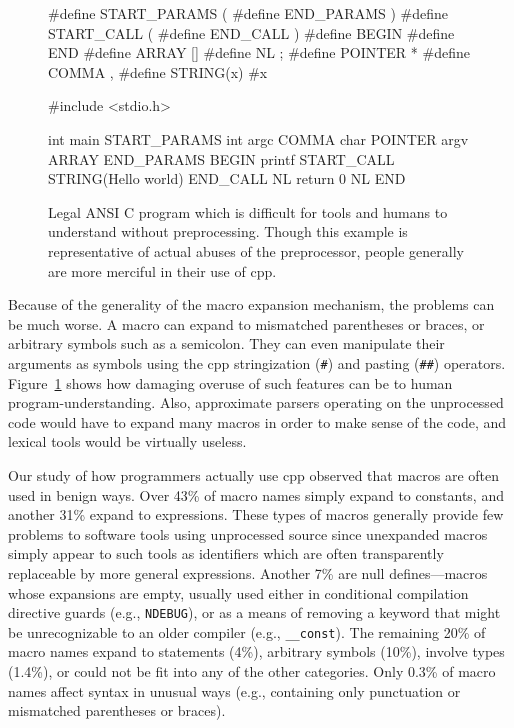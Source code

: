\documentclass{article}
\newcommand{\Cpp}{\mbox{\textsf{cpp}}}
\newcommand{\C}{\mbox{C}}
\newcommand{\eg}{e.g.,}
\begin{document}
\begin{figure}[hbtp]
\begin{center}
\begin{small}
\begin{pseudocode}[5.5in]
#define START_PARAMS (
#define END_PARAMS )
#define START_CALL (
#define END_CALL )
#define BEGIN {
#define END }
#define ARRAY []
#define NL ;
#define POINTER *
#define COMMA ,
#define STRING(x) #x

#include <stdio.h>

int main START_PARAMS int argc COMMA char POINTER argv ARRAY END_PARAMS BEGIN
  printf START_CALL STRING(Hello world\n) END_CALL NL
  return 0 NL
END
\end{pseudocode}
\end{small}
\caption{Legal ANSI \C{} program which is difficult for tools and humans
  to understand without preprocessing.  Though this example is
  representative of actual abuses of the preprocessor, people generally
  are more merciful in their use of \Cpp{}.}
\label{fig:worstcase}
\end{center}
\end{figure}

Because of the generality of the macro expansion mechanism, the problems
can be much worse.  A macro can expand to mismatched parentheses or
braces, or arbitrary symbols such as a semicolon.  They can even
manipulate their arguments as symbols using the \Cpp{} stringization
(\texttt{\#}) and pasting (\texttt{\#\#}) operators.
Figure~\ref{fig:worstcase} shows how damaging overuse of such features
can be to human program-understanding.  Also, approximate parsers operating on
the unprocessed code would have to expand many macros in order to make
sense of the code, and lexical tools would be virtually useless.

Our study of how programmers actually use
\Cpp{} observed that macros are often used in benign ways.  Over 43\% of macro
names simply expand to constants, and another 31\% expand to
expressions.  These types of macros generally provide few problems to
software tools using unprocessed source since unexpanded macros simply
appear to such tools as identifiers which are often transparently
replaceable by more general expressions.  Another 7\% are null
defines---macros whose expansions are empty, usually used either in
conditional compilation directive guards (\eg{} \texttt{NDEBUG}), or as a means
of removing a keyword that might be unrecognizable to an older compiler
(\eg{} \texttt{\_\_const}).  The remaining 20\% of macro names expand to statements
(4\%), arbitrary symbols (10\%), involve types (1.4\%), or could not be
fit into any of the other categories.  Only 0.3\% of macro names affect syntax in
unusual ways (\eg{} containing only punctuation or mismatched
parentheses or braces).
\end{document}
